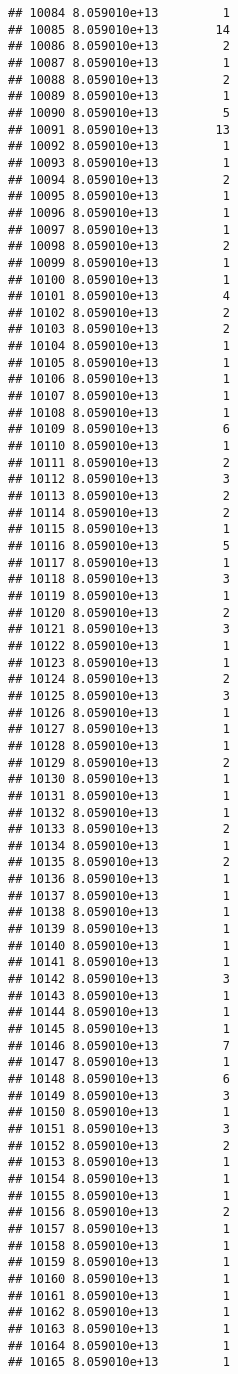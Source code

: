 \documentclass[
]{article}
\begin{document}
\begin{verbatim}
## 10084 8.059010e+13         1
## 10085 8.059010e+13        14
## 10086 8.059010e+13         2
## 10087 8.059010e+13         1
## 10088 8.059010e+13         2
## 10089 8.059010e+13         1
## 10090 8.059010e+13         5
## 10091 8.059010e+13        13
## 10092 8.059010e+13         1
## 10093 8.059010e+13         1
## 10094 8.059010e+13         2
## 10095 8.059010e+13         1
## 10096 8.059010e+13         1
## 10097 8.059010e+13         1
## 10098 8.059010e+13         2
## 10099 8.059010e+13         1
## 10100 8.059010e+13         1
## 10101 8.059010e+13         4
## 10102 8.059010e+13         2
## 10103 8.059010e+13         2
## 10104 8.059010e+13         1
## 10105 8.059010e+13         1
## 10106 8.059010e+13         1
## 10107 8.059010e+13         1
## 10108 8.059010e+13         1
## 10109 8.059010e+13         6
## 10110 8.059010e+13         1
## 10111 8.059010e+13         2
## 10112 8.059010e+13         3
## 10113 8.059010e+13         2
## 10114 8.059010e+13         2
## 10115 8.059010e+13         1
## 10116 8.059010e+13         5
## 10117 8.059010e+13         1
## 10118 8.059010e+13         3
## 10119 8.059010e+13         1
## 10120 8.059010e+13         2
## 10121 8.059010e+13         3
## 10122 8.059010e+13         1
## 10123 8.059010e+13         1
## 10124 8.059010e+13         2
## 10125 8.059010e+13         3
## 10126 8.059010e+13         1
## 10127 8.059010e+13         1
## 10128 8.059010e+13         1
## 10129 8.059010e+13         2
## 10130 8.059010e+13         1
## 10131 8.059010e+13         1
## 10132 8.059010e+13         1
## 10133 8.059010e+13         2
## 10134 8.059010e+13         1
## 10135 8.059010e+13         2
## 10136 8.059010e+13         1
## 10137 8.059010e+13         1
## 10138 8.059010e+13         1
## 10139 8.059010e+13         1
## 10140 8.059010e+13         1
## 10141 8.059010e+13         1
## 10142 8.059010e+13         3
## 10143 8.059010e+13         1
## 10144 8.059010e+13         1
## 10145 8.059010e+13         1
## 10146 8.059010e+13         7
## 10147 8.059010e+13         1
## 10148 8.059010e+13         6
## 10149 8.059010e+13         3
## 10150 8.059010e+13         1
## 10151 8.059010e+13         3
## 10152 8.059010e+13         2
## 10153 8.059010e+13         1
## 10154 8.059010e+13         1
## 10155 8.059010e+13         1
## 10156 8.059010e+13         2
## 10157 8.059010e+13         1
## 10158 8.059010e+13         1
## 10159 8.059010e+13         1
## 10160 8.059010e+13         1
## 10161 8.059010e+13         1
## 10162 8.059010e+13         1
## 10163 8.059010e+13         1
## 10164 8.059010e+13         1
## 10165 8.059010e+13         1

\end{verbatim}
\end{document}
